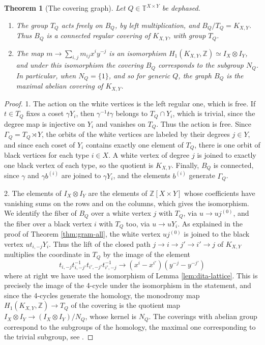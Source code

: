 \documentclass[11pt,reqno]{amsart}
\newtheorem{thm}{Theorem}[section]
\theoremstyle{definition}
\numberwithin{equation}{section}
\begin{document}
\begin{thm}[The covering graph]\label{thm:covering}
Let $Q\in\mathbb T^{X\times Y}$ be dephased.
\begin{enumerate}
\item The group $T_Q$ acts freely on $B_Q$, by left multiplication, and $B_Q/T_Q=K_{X,Y}$. Thus $B_Q$ is a connected regular covering of $K_{X,Y}$, with group $T_Q$.

\item The map $m\to\sum_{i,j}m_{ij}x^iy^{-j}$ is an isomorphism $H_1(K_{X,Y},\mathbb Z)\simeq I_X\otimes I_Y$, and under this isomorphism the covering $B_Q$ corresponds to the subgroup $N_Q$. In particular, when $N_Q=\{1\}$, and so for generic $Q$, the graph $B_Q$ is the maximal abelian covering of $K_{X,Y}$.
\end{enumerate}
\end{thm}

\begin{proof}
1. The action on the white vertices is the left regular one, which is free. If $t\in T_Q$ fixes a coset $\gamma Y_i$, then $\gamma^{-1}t\gamma$ belongs to $T_Q\cap Y_i$, which is trivial, since the degree map is injective on $Y_i$ and vanishes on $T_Q$. Thus the action is free. Since $\Gamma_Q=T_Q\rtimes Y$, the orbits of the white vertices are labeled by their degrees $j\in Y$, and since each coset of $Y_i$ contains exactly one element of $T_Q$, there is one orbit of black vertices for each type $i\in X$. A white vertex of degree $j$ is joined to exactly one black vertex of each type, so the quotient is $K_{X,Y}$. Finally, $B_Q$ is connected, since $\gamma$ and $\gamma b^{(i)}$ are joined to $\gamma Y_i$, and the elements $b^{(i)}$ generate $\Gamma_Q$.

2. The elements of $I_X\otimes I_Y$ are the elements of $\mathbb Z[X\times Y]$ whose coefficients have vanishing sums on the rows and on the columns, which gives the isomorphism. We identify the fiber of $B_Q$ over a white vertex $j$ with $T_Q$, via $u\to uj^{(0)}$, and the fiber over a black vertex $i$ with $T_Q$ too, via $u\to uY_i$. As explained in the proof of Theorem \ref{thm:gram-all}, the white vertex $uj^{(0)}$ is joined to the black vertex $ut_{i,-j}Y_i$. Thus the lift of the closed path $j\to i\to j'\to i'\to j$ of $K_{X,Y}$ multiplies the coordinate in $T_Q$ by the image of the element
$$t_{i,-j}t_{i,-j'}^{-1}t_{i',-j'}t_{i',-j}^{-1}\to(x^i-x^{i'})(y^{-j}-y^{-j'})$$
where at right we have used the isomorphism of Lemma \ref{lem:dita-lattice}. This is precisely the image of the 4-cycle under the isomorphism in the statement, and since the 4-cycles generate the homology, the monodromy map $H_1(K_{X,Y},\mathbb Z)\to T_Q$ of the covering is the quotient map $I_X\otimes I_Y\to(I_X\otimes I_Y)/N_Q$, whose kernel is $N_Q$. The coverings with abelian group correspond to the subgroups of the homology, the maximal one corresponding to the trivial subgroup, see \cite{KS01,Sun13}.
\end{proof}
\end{document}
